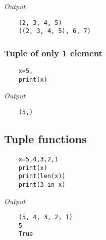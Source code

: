 \documentclass{report}
\begin{document}
	\textit{Output}
	\vspace{-15pt}
	\begin{verbatim}
	(2, 3, 4, 5)
	((2, 3, 4, 5), 6, 7)
	\end{verbatim}
	\vspace{-10pt}
	
	\subsubsection{Tuple of only 1 element}
	\vspace{-15pt}
	\begin{verbatim}
	x=5,
	print(x)
	\end{verbatim}
	\vspace{-10pt}
	
	\textit{Output}
	\vspace{-15pt}
	\begin{verbatim}
	(5,)
	\end{verbatim}
	\vspace{-10pt}
	
	\subsection{Tuple functions}
	\vspace{-15pt}
	\begin{verbatim}
	x=5,4,3,2,1
	print(x)
	print(len(x))
	print(3 in x)
	\end{verbatim}
	\vspace{-10pt}
	
	\textit{Output}
	\vspace{-15pt}
	\begin{verbatim}
	(5, 4, 3, 2, 1)
	5
	True
	\end{verbatim}
	\vspace{-10pt}
	
\end{document}
